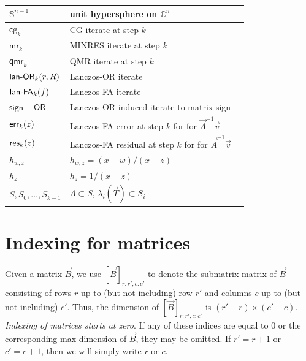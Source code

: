 \begin{center}
\begin{tabularx}{\textwidth}{p{1.9cm}Xr}
        \( \mathbb{S}^{n-1} \) & unit hypersphere on \( \mathbb{C}^n \) & \pageref{eqn:hypersphere} \\ 
    \midrule
        \( \mathsf{cg}_k \) & CG iterate at step \( k \) & \pageref{eqn:cg_def} \\
        \( \mathsf{mr}_k \) & MINRES iterate at step \( k \) & \pageref{eqn:mr_def} \\
        \( \mathsf{qmr}_k \) & QMR iterate at step \( k \) & \pageref{eqn:qmr_def} \\
        \( \textup{\textsf{lan-OR}}_k(r,R) \) & Lanczos-OR iterate & \pageref{def:lanczos_or} \\
        \( \textup{\textsf{lan-FA}}_k(f) \) & Lanczos-FA iterate & \pageref{def:lanczos_fa} \\
        \( \mathsf{sign-OR} \) & Lanczos-OR induced iterate to matrix sign & \pageref{def:sign_or} \\ 
    \midrule
        \( \textup{\textsf{err}}_k(z) \) & Lanczos-FA error at step \( k \) for for \( \vec{A}^{-1} \vec{v} \) & \pageref{def:err} \\ 
        \( \textup{\textsf{res}}_k(z) \) & Lanczos-FA residual at step \( k \) for for \( \vec{A}^{-1} \vec{v} \) & \pageref{def:err} \\ 
        \( h_{w,z} \) & \( h_{w,z} = (x-w)/(x-z) \) & \pageref{def:hwz} \\
        \( h_{z} \) & \( h_{z} = 1/(x-z) \) & \pageref{def:hwz} \\
        \( S, S_0, \ldots, S_{k-1} \) & \( \Lambda \subset  S \), \( \lambda_i(\vec{T}) \subset S_i \) & \pageref{thm:err_int} \\
\end{tabularx}
\end{center}

\section{Indexing for matrices}

Given a matrix \( \vec{B} \), we use \( [\vec{B}]_{r:r',c:c'} \) to denote the submatrix matrix of \( \vec{B} \) consisting of rows \( r \) up to (but not including) row \( r' \) and columns \( c \) up to  (but not including) \( c' \).
Thus, the dimension of \( [\vec{B}]_{r:r',c:c'} \) is \( (r'-r)\times (c'-c) \).
\emph{Indexing of matrices starts at zero}.
If any of these indices are equal to \( 0 \) or the corresponding max dimension of \( \vec{B} \), they may be omitted.
If \( r' = r+1  \) or \( c' = c+1 \), then we will simply write \( r \) or \( c \).

